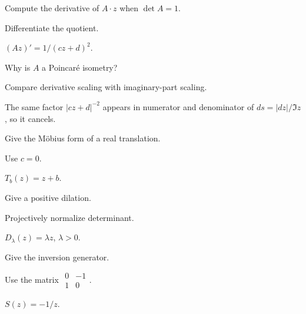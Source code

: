 \begin{exercise}\label{exr:vii33-07}
Compute the derivative of \(A\cdot z\) when \(\det A=1\).
\end{exercise}
\begin{hint}
Differentiate the quotient.
\end{hint}
\begin{solution}
\((Az)'=1/(cz+d)^2\).
\end{solution}

\begin{exercise}\label{exr:vii33-08}
Why is \(A\) a Poincaré isometry?
\end{exercise}
\begin{hint}
Compare derivative scaling with imaginary-part scaling.
\end{hint}
\begin{solution}
The same factor \(|cz+d|^{-2}\) appears in numerator and denominator of \(ds=|dz|/\Im z\), so it cancels.
\end{solution}

\begin{exercise}\label{exr:vii33-09}
Give the Möbius form of a real translation.
\end{exercise}
\begin{hint}
Use \(c=0\).
\end{hint}
\begin{solution}
\(T_b(z)=z+b\).
\end{solution}

\begin{exercise}\label{exr:vii33-10}
Give a positive dilation.
\end{exercise}
\begin{hint}
Projectively normalize determinant.
\end{hint}
\begin{solution}
\(D_\lambda(z)=\lambda z\), \(\lambda>0\).
\end{solution}

\begin{exercise}\label{exr:vii33-11}
Give the inversion generator.
\end{exercise}
\begin{hint}
Use the matrix \(\begin{smallmatrix}0&-1\\1&0\end{smallmatrix}\).
\end{hint}
\begin{solution}
\(S(z)=-1/z\).
\end{solution}

